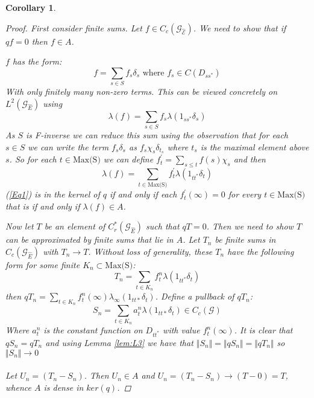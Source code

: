 \documentclass[11pt]{amsart}
\theoremstyle{plain}
\newtheorem{corollary}[theorem]{Corollary}%
\theoremstyle{definition}%
\theoremstyle{remark}%
\newcommand{\G}{\mathcal{G}}
\newcommand{\E}{\widehat{E}}
\begin{document}
\begin{corollary}
\begin{proof}
First consider finite sums. Let $f \in C_{c}(\mathcal{G_{\E}})$. We need to show that if $qf=0$ then $ f \in A$.

$f$ has the form:
\begin{equation*}
f=\sum_{s \in S} f_{s}\delta_{s} \mbox{ where } f_{s}\in C(D_{ss^{*}})
\end{equation*}
With only finitely many non-zero terms. This can be viewed concretely on $L^{2}(\mathcal{G}_{\E})$ using
\begin{equation*}
\lambda(f)=\sum_{s \in S} f_{s}\lambda(1_{ss^{*}}\delta_{s})
\end{equation*}
As $S$ is F-inverse we can reduce this sum using the observation that for each $s \in S$ we can write the term $f_{s}\delta_{s}$ as $f_{s}\chi_{s}\delta_{t_{s}}$ where $t_{s}$ is the maximal element above $s$. So for each $t \in \text{Max(S)}$ we can define $f^{'}_{t}=\sum_{s \leq t}f(s)\chi_{s}$ and then
\begin{equation}\label{Eq1}
\lambda(f)=\sum_{t \in \text{Max(S)}} f^{'}_{t}\lambda(1_{tt^{*}}\delta_{t})
\end{equation}
(\ref{Eq1}) is in the kernel of $q$ if and only if each $f^{'}_{t}(\infty)=0$ for every $t \in \text{Max(S)}$ that is if and only if $\lambda(f) \in A$.

Now let $T$ be an element of $C^{*}_{r}(\G_{\E})$ such that $qT=0$. Then we need to show $T$ can be approximated by finite sums that lie in $A$. Let $T_{n}$ be finite sums in $C_{c}(\mathcal{G}_{\E})$ with $T_{n} \rightarrow T$. Without loss of generality, these $T_{n}$ have the following form for some finite $K_{n} \subset \text{Max(S)}$:
\begin{equation*}
T_{n}=\sum_{t \in K_{n}} f^{n}_{t}\lambda(1_{tt^{*}}\delta_{t})
\end{equation*}
then $qT_{n} = \sum_{t \in K_{n}} f^{n}_{t}(\infty)\lambda_{\infty}(1_{tt*}\delta_{t})$. Define a pullback of $qT_{n}$:
\begin{equation}
S_{n} = \sum_{t \in K_{n}} a^{n}_{t}\lambda(1_{tt*}\delta_{t}) \in C_{c}(\mathcal{G})
\end{equation}
Where $a^{n}_{t}$ is the constant function on $D_{tt^{*}}$ with value $f_{t}^{n}(\infty)$. It is clear that $qS_{n}=qT_{n}$ and using Lemma \ref{lem:L3} we have that $\Vert S_{n} \Vert = \Vert qS_{n} \Vert = \Vert qT_{n} \Vert$ so $\Vert S_{n} \Vert \rightarrow 0$\\
\\
Let $U_{n}=(T_{n}-S_{n})$. Then $U_{n} \in A$ and $U_{n}=(T_{n}-S_{n}) \rightarrow (T-0)=T$, whence $A$ is dense in $ker(q)$.
\end{proof} 


\end{corollary}
\end{document}
